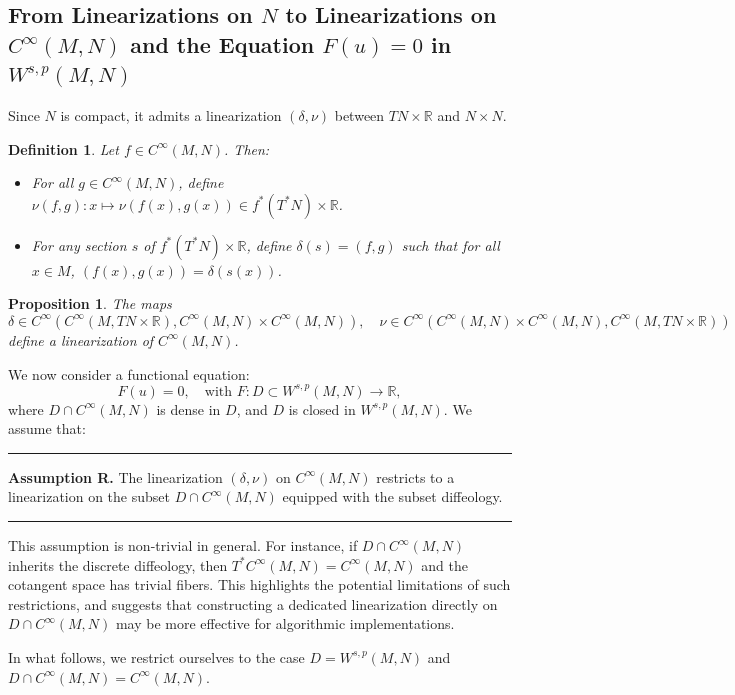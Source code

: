 \documentclass{amsart}
\newcounter{thm}
\newcounter{ex}
\newcounter{re}
\newtheorem{Proposition}[thm]{Proposition}
\newtheorem{Definition}[thm]{Definition}
\begin{document}
\subsection{From Linearizations on $N$ to Linearizations on $C^\infty(M,N)$ and the Equation $F(u) = 0$ in $W^{s,p}(M,N)$}

Since $N$ is compact, it admits a linearization $(\delta,\nu)$ between $TN \times \mathbb{R}$ and $N \times N$.

\begin{Definition}
	Let $f \in C^\infty(M,N)$. Then:
	\begin{itemize}
		\item For all $g \in C^\infty(M,N)$, define $\nu(f,g) : x \mapsto \nu(f(x),g(x)) \in f^*(T^*N) \times \mathbb{R}$.
		\item For any section $s$ of $f^*(T^*N) \times \mathbb{R}$, define $\delta(s) = (f,g)$ such that for all $x \in M$, $(f(x),g(x)) = \delta(s(x))$.
	\end{itemize}
\end{Definition}

\begin{Proposition}
	The maps
	\[
	\delta \in C^\infty(C^\infty(M,TN \times \mathbb{R}), C^\infty(M,N) \times C^\infty(M,N)),
	\quad
	\nu \in C^\infty(C^\infty(M,N) \times C^\infty(M,N), C^\infty(M,TN \times \mathbb{R}))
	\]
	define a linearization of $C^\infty(M,N)$.
\end{Proposition}

We now consider a functional equation:
\[
F(u) = 0, \quad \text{with } F : D \subset W^{s,p}(M,N) \rightarrow \mathbb{R},
\]
where $D \cap C^\infty(M,N)$ is dense in $D$, and $D$ is closed in $W^{s,p}(M,N)$. We assume that:

\vskip 12pt
\hrule
\vskip 6pt
\noindent \textbf{Assumption R.}
The linearization $(\delta,\nu)$ on $C^\infty(M,N)$ restricts to a linearization on the subset $D \cap C^\infty(M,N)$ equipped with the subset diffeology.
\vskip 6pt
\hrule
\vskip 12pt

This assumption is non-trivial in general. For instance, if $D \cap C^\infty(M,N)$ inherits the discrete diffeology, then $T^*C^\infty(M,N) = C^\infty(M,N)$ and the cotangent space has trivial fibers. This highlights the potential limitations of such restrictions, and suggests that constructing a dedicated linearization directly on $D \cap C^\infty(M,N)$ may be more effective for algorithmic implementations.

In what follows, we restrict ourselves to the case $D = W^{s,p}(M,N)$ and $D \cap C^\infty(M,N) = C^\infty(M,N)$.
\end{document}
